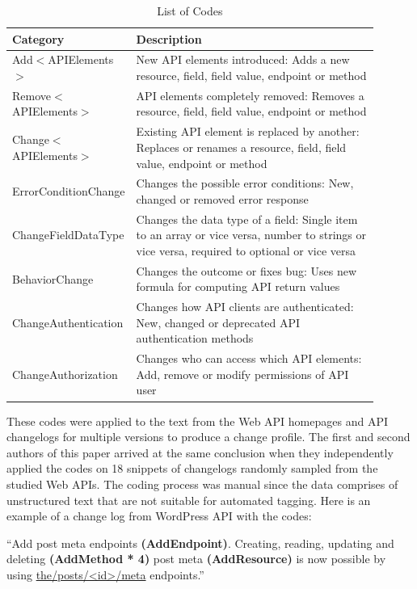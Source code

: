 \documentclass[conference]{IEEEtran}
\begin{document}
\begin{table}[!tbh]
\caption{List of Codes}
\label{coding_scheme}
\begin{tabular}{|p{0.2\linewidth}|p{0.7\linewidth}|}
\hline
\textbf{Category} & \textbf{Description}\\
\hline
Add$<$APIElements$>$ & New API elements introduced: Adds a new resource, field, field value, endpoint or method\\
\hline
Remove$<$APIElements$>$ & API elements completely removed: Removes a resource, field, field value, endpoint or method\\
\hline
Change$<$APIElements$>$ & Existing API element is replaced by another: Replaces or renames a resource, field, field value, endpoint or method\\
\hline
ErrorConditionChange & Changes the possible error conditions: New, changed or removed error response \\
\hline
ChangeFieldDataType & Changes the data type of a field: Single item to an array or vice versa, number to strings or vice versa, required to optional or vice versa\\
\hline
BehaviorChange & Changes the outcome or fixes bug: Uses new formula for computing API return values\\
\hline
ChangeAuthentication & Changes how API clients are authenticated: New, changed or deprecated API authentication methods\\
\hline
ChangeAuthorization & Changes who can access which API elements: Add, remove or modify permissions of API user\\
\hline
\end{tabular}
\end{table}

These codes were applied to the text from the Web API homepages and API changelogs for multiple versions to produce a change profile. The first and second authors of this paper arrived at the same conclusion when they independently applied the  codes on 18 snippets of changelogs randomly sampled from the studied Web APIs. The coding process was manual since the data comprises of unstructured text that are not suitable for automated tagging. Here is an example of a change log from WordPress API with the codes:

\small
``Add post meta endpoints \textbf{(AddEndpoint)}.
Creating, reading, updating and deleting \textbf{(AddMethod * 4)}
post meta \textbf{(AddResource)} is now possible by
using \url{the/posts/<id>/meta} endpoints.''
\normalsize
\end{document}
